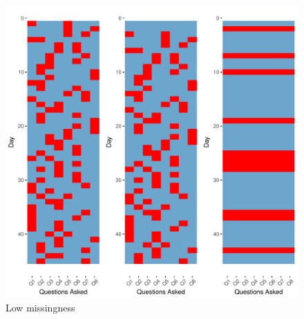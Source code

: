 \documentclass{svjour3}\usepackage[]{graphicx}\usepackage[]{color}
\makeatletter
\def\maxwidth{ %
  \ifdim\Gin@nat@width>\linewidth
    \linewidth
  \else
    \Gin@nat@width
  \fi
}
\newenvironment{knitrout}{}{} %
\makeatother
\begin{document}


























\begin{knitrout}
\color{fgcolor}\begin{figure}
\includegraphics[width=\maxwidth]{figure/misslow-1} \caption[Low missingness]{Low missingness}\label{fig:misslow}
\end{figure}


\end{knitrout}
\end{document}
